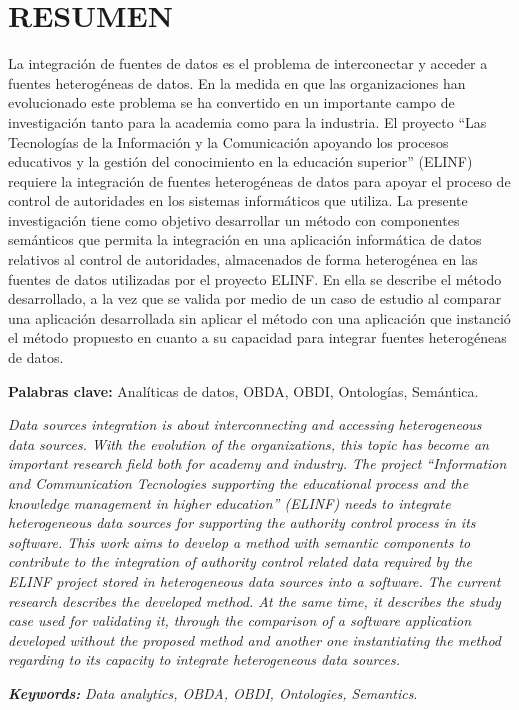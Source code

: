 \chapter*{\large RESUMEN}

La integración de fuentes de datos es el problema de interconectar y acceder a fuentes heterogéneas de datos. En la medida en que las organizaciones han evolucionado este problema se ha convertido en un importante campo de investigación tanto para la academia como para la industria. El proyecto ``Las Tecnologías de la Información y la Comunicación apoyando los procesos educativos y la gestión del conocimiento en la educación superior'' (ELINF) requiere la integración de fuentes heterogéneas de datos para apoyar el proceso de control de autoridades en los sistemas informáticos que utiliza. La presente investigación tiene como objetivo desarrollar un método con componentes semánticos que permita la integración en una aplicación informática de datos relativos al control de autoridades, almacenados de forma heterogénea en las fuentes de datos utilizadas por el proyecto ELINF. En ella se describe el método desarrollado, a la vez que se valida por medio de un caso de estudio al comparar una aplicación desarrollada sin aplicar el método con una aplicación que instanció el método propuesto en cuanto a su capacidad para integrar fuentes heterogéneas de datos.

\textbf{Palabras clave:} Analíticas de datos, OBDA, OBDI, Ontologías, Semántica.

\textit{Data sources integration is about interconnecting and accessing heterogeneous data sources. With the evolution of the organizations, this topic has become an important research field both for academy and industry. The project ``Information and Communication Tecnologies supporting the educational process and the knowledge management in higher education'' (ELINF) needs to integrate heterogeneous data sources for supporting the authority control process in its software. This work aims to develop a method with semantic components to contribute to the integration of authority control related data required by the ELINF project stored in heterogeneous data sources  into a software. The current research describes the developed method. At the same time, it describes the study case used for validating it, through the comparison of a software application developed without the proposed method and another one instantiating the method regarding to its capacity to integrate heterogeneous data sources.}

\textit{\textbf{Keywords: }} \textit{Data analytics, OBDA, OBDI, Ontologies, Semantics}.